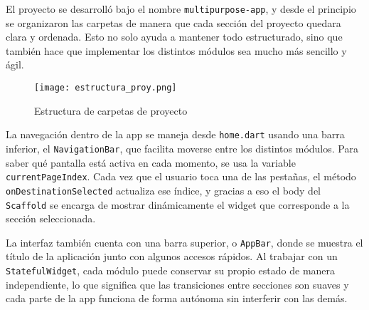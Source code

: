 El proyecto se desarrolló bajo el nombre \lstinline{multipurpose-app}, y desde el principio se organizaron las carpetas de manera que cada sección del proyecto quedara clara y ordenada. Esto no solo ayuda a mantener todo estructurado, sino que también hace que implementar los distintos módulos sea mucho más sencillo y ágil.

\begin{figure}[H]
    \centering
    \texttt{[image: estructura\_proy.png]}
    \caption{Estructura de carpetas de proyecto}
    \label{fig:strpry}
\end{figure}

La navegación dentro de la app se maneja desde \lstinline{home.dart} usando una barra inferior, el \lstinline{NavigationBar}, que facilita moverse entre los distintos módulos. Para saber qué pantalla está activa en cada momento, se usa la variable \lstinline{currentPageIndex}. Cada vez que el usuario toca una de las pestañas, el método \lstinline{onDestinationSelected} actualiza ese índice, y gracias a eso el body del \lstinline{Scaffold} se encarga de mostrar dinámicamente el widget que corresponde a la sección seleccionada.

La interfaz también cuenta con una barra superior, o \lstinline{AppBar}, donde se muestra el título de la aplicación junto con algunos accesos rápidos. Al trabajar con un \lstinline{StatefulWidget}, cada módulo puede conservar su propio estado de manera independiente, lo que significa que las transiciones entre secciones son suaves y cada parte de la app funciona de forma autónoma sin interferir con las demás.
